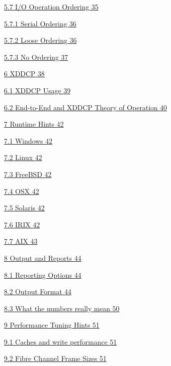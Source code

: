 \hyperref[io-operation-ordering]{5.7 I/O Operation Ordering \hyperref[io-operation-ordering]{35}}

\hyperref[serial-ordering]{5.7.1 Serial Ordering \hyperref[serial-ordering]{36}}

\hyperref[loose-ordering]{5.7.2 Loose Ordering \hyperref[loose-ordering]{36}}

\hyperref[no-ordering]{5.7.3 No Ordering \hyperref[no-ordering]{37}}

\hyperref[xddcp]{6 XDDCP \hyperref[xddcp]{38}}

\hyperref[xddcp-usage]{6.1 XDDCP Usage \hyperref[xddcp-usage]{39}}

\hyperref[end-to-end-and-xddcp-theory-of-operation]{6.2 End-to-End and XDDCP Theory of Operation \hyperref[end-to-end-and-xddcp-theory-of-operation]{40}}

\hyperref[runtime-hints]{7 Runtime Hints \hyperref[runtime-hints]{42}}

\hyperref[windows]{7.1 Windows \hyperref[windows]{42}}

\hyperref[linux-1]{7.2 Linux \hyperref[linux-1]{42}}

\hyperref[freebsd]{7.3 FreeBSD \hyperref[freebsd]{42}}

\hyperref[osx]{7.4 OSX \hyperref[osx]{42}}

\hyperref[solaris]{7.5 Solaris \hyperref[solaris]{42}}

\hyperref[irix]{7.6 IRIX \hyperref[irix]{42}}

\hyperref[aix-1]{7.7 AIX \hyperref[aix-1]{43}}

\hyperref[output-and-reports]{8 Output and Reports \hyperref[output-and-reports]{44}}

\hyperref[reporting-options]{8.1 Reporting Options \hyperref[reporting-options]{44}}

\hyperref[output-format]{8.2 Output Format \hyperref[output-format]{44}}

\hyperref[what-the-numbers-really-mean]{8.3 What the numbers really mean \hyperref[what-the-numbers-really-mean]{50}}

\hyperref[performance-tuning-hints]{9 Performance Tuning Hints \hyperref[performance-tuning-hints]{51}}

\hyperref[caches-and-write-performance]{9.1 Caches and write performance \hyperref[caches-and-write-performance]{51}}

\hyperref[fibre-channel-frame-sizes]{9.2 Fibre Channel Frame Sizes \hyperref[fibre-channel-frame-sizes]{51}}

